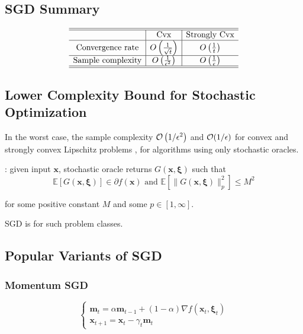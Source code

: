 \subsection*{SGD Summary}
$$
\begin{array}{c|c|c}
\hline \hline & \text {Cvx} & \text {Strongly Cvx} \\
\hline \text {Convergence rate} & O\left(\frac{1}{\sqrt{t}}\right) & O\left(\frac{1}{t}\right) \\
\hline \text {Sample complexity} & O\left(\frac{1}{\epsilon^{2}}\right) & O\left(\frac{1}{\epsilon}\right) \\
\hline \hline
\end{array}
$$





\subsection*{Lower Complexity Bound for Stochastic Optimization}
In the worst case, the sample complexity $\operatorname{\mathcal{O}}\left(1 / \epsilon^{2}\right)$ and $\operatorname{\mathcal{O}}(1 / \epsilon)$ for convex and strongly convex Lipschitz problems , for algorithms using only stochastic oracles.

: given input $\mathbf{x}$, stochastic oracle returns $G(\mathbf{x}, \boldsymbol{\xi})$ such that
$$
\mathbb{E}[G(\mathbf{x}, \boldsymbol{\xi})] \in \partial f(\mathbf{x}) \text { and } \mathbb{E}\left[\|G(\mathbf{x}, \boldsymbol{\xi})\|_{p}^{2}\right] \leq M^{2}
$$

for some positive constant $M$ and some $p \in[1, \infty]$.

SGD is  for such problem classes.





\subsection*{Popular Variants of SGD}
\subsubsection*{Momentum SGD}
$$
\left\{\begin{array}{l}
\mathbf{m}_{t}=\alpha \mathbf{m}_{t-1}+(1-\alpha) \nabla f\left(\mathbf{x}_{t}, \boldsymbol{\xi}_{t}\right) \\
\mathbf{x}_{t+1}=\mathbf{x}_{t}-\gamma_{t} \mathbf{m}_{t}
\end{array}\right.
$$
